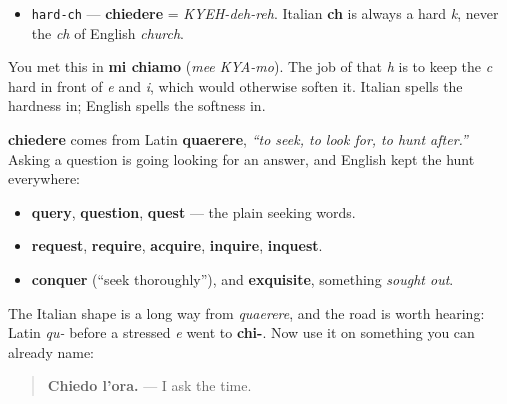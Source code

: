 \begin{sounds}
\begin{itemize}
\raggedright
  \item \texttt{hard-ch} — \textbf{chiedere} = \emph{KYEH-deh-reh}. Italian \textbf{ch} is always a hard \emph{k}, never the \emph{ch} of English \emph{church}.
\end{itemize}

You met this in \textbf{mi chiamo} (\emph{mee KYA-mo}). The job of that \emph{h} is to keep the \emph{c} hard in front of \emph{e} and \emph{i}, which would otherwise soften it. Italian spells the hardness in; English spells the softness in.
\end{sounds}

\begin{cousinweb}
\textbf{chiedere} comes from Latin \textbf{quaerere}, \emph{\textquotedblleft{}to seek, to look for, to hunt after.\textquotedblright{}} Asking a question is going looking for an answer, and English kept the hunt everywhere:

\begin{itemize}
\raggedright
  \item \textbf{query}, \textbf{question}, \textbf{quest} — the plain seeking words.
  \item \textbf{request}, \textbf{require}, \textbf{acquire}, \textbf{inquire}, \textbf{inquest}.
  \item \textbf{conquer} (\textquotedblleft{}seek thoroughly\textquotedblright{}), and \textbf{exquisite}, something \emph{sought out}.
\end{itemize}

The Italian shape is a long way from \emph{quaerere}, and the road is worth hearing: Latin \emph{qu-} before a stressed \emph{e} went to \textbf{chi-}. Now use it on something you can already name:

\begin{quote}
\textbf{Chiedo l'ora.} — I ask the time.
\end{quote}
\end{cousinweb}

